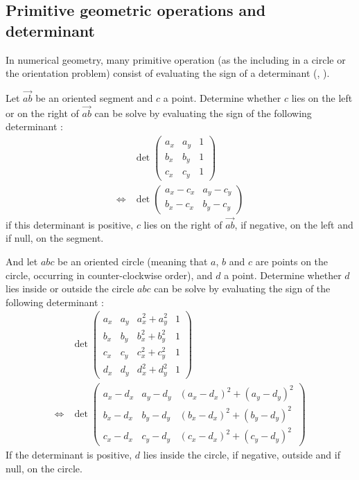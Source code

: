\subsection{Primitive geometric operations and determinant}
In numerical geometry, many primitive operation (as the including in a circle or the orientation problem) consist of evaluating the sign of a determinant (\cite{bronnimann2000efficient}, \cite{robust}).

Let $\overrightarrow{ab}$ be an oriented segment and $c$ a point. Determine whether $c$ lies on the left or on the right of $\overrightarrow{ab}$ can be solve by evaluating the sign of the following determinant : 
\begin{align}
& \det \begin{pmatrix}
a_x & a_y & 1\\
b_x & b_y & 1\\
c_x & c_y & 1
\end{pmatrix} \label{eq:detOrientation1}\\
\Leftrightarrow & \det \begin{pmatrix}
a_x - c_x & a_y - c_y \\
b_x - c_x & b_y - c_y
\end{pmatrix} \label{eq:detOrientation2}
\end{align}
if this determinant is positive, $c$ lies on the right of $\overrightarrow{ab}$, if negative, on the left and if null, on the segment.


And let $abc$ be an oriented circle (meaning that $a$, $b$ and $c$ are points on the circle, occurring in counter-clockwise order), and $d$ a point. Determine whether $d$ lies inside or outside the circle $abc$ can be solve by evaluating the sign of the following determinant : 
\begin{align}
& \det \begin{pmatrix}
a_x & a_y & a_x^2 + a_y ^2 & 1\\
b_x & b_y & b_x^2 + b_y^2 & 1\\
c_x & c_y & c_x^2+c_y^2 & 1 \\
d_x & d_y & d_x^2+d_y^2 & 1
\end{pmatrix} \label{eq:Incircle1}\\
\Leftrightarrow & \det \begin{pmatrix}
a_x-d_x & a_y-d_y & (a_x-d_x)^2 + (a_y - d_y)^2\\
b_x-d_x & b_y - d_y & (b_x-d_x)^2 + (b_y - d_y)^2\\
c_x-d_x & c_y - d_y & (c_x-d_x)^2 + (c_y - d_y)^2
\end{pmatrix} \label{eq:Incircle2}
\end{align}
If the determinant is positive, $d$ lies inside the circle, if negative, outside and if null, on the circle.

